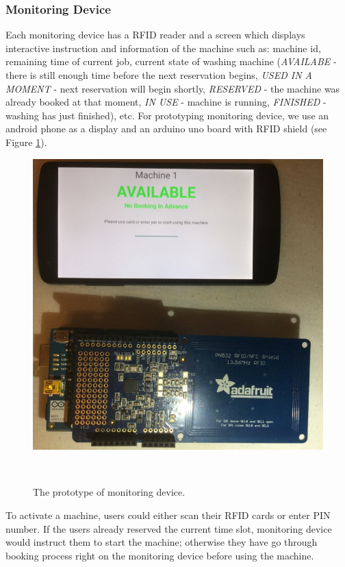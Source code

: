 \subsubsection{Monitoring Device}
Each monitoring device has a RFID reader and a screen which displays interactive instruction and information of the machine such as: machine id, remaining time of current job, current state of washing machine (\emph{AVAILABE} - there is still enough time before the next reservation begins, \emph{USED IN A MOMENT} - next reservation will begin shortly, \emph{RESERVED} - the machine was already booked at that moment, \emph{IN USE} - machine is running, \emph{FINISHED} - washing has just finished), etc.
 For prototyping monitoring device, we use an android phone as a display and an arduino uno board with RFID shield (see Figure \ref{fig:figure2}).
\begin{figure}[h]
\centering
  \includegraphics[width=0.7\columnwidth]{figures/Monitoring}
  \caption{The prototype of monitoring device.}~\label{fig:figure2}
\end{figure}
To activate a machine, users could either scan their RFID cards or enter PIN number. If the users already reserved the current time slot, monitoring device would instruct them to start the machine; otherwise they have go through booking process right on the monitoring device before using the machine.

